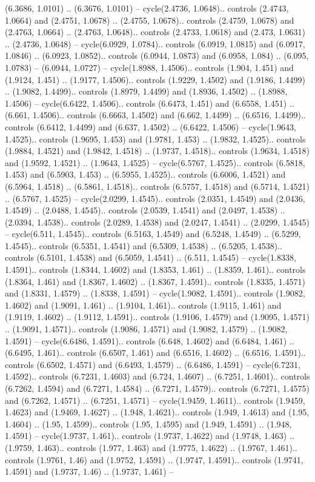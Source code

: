 (6.3686, 1.0101) .. (6.3676, 1.0101) -- cycle(2.4736, 1.0648).. controls (2.4743, 1.0664) and (2.4751, 1.0678) .. (2.4755, 1.0678).. controls (2.4759, 1.0678) and (2.4763, 1.0664) .. (2.4763, 1.0648).. controls (2.4733, 1.0618) and (2.473, 1.0631) .. (2.4736, 1.0648) -- cycle(6.0929, 1.0784).. controls (6.0919, 1.0815) and (6.0917, 1.0846) .. (6.0923, 1.0852).. controls (6.0944, 1.0873) and (6.0958, 1.084) .. (6.095, 1.0783) -- (6.0944, 1.0727) -- cycle(1.8988, 1.4506).. controls (1.904, 1.451) and (1.9124, 1.451) .. (1.9177, 1.4506).. controls (1.9229, 1.4502) and (1.9186, 1.4499) .. (1.9082, 1.4499).. controls (1.8979, 1.4499) and (1.8936, 1.4502) .. (1.8988, 1.4506) -- cycle(6.6422, 1.4506).. controls (6.6473, 1.451) and (6.6558, 1.451) .. (6.661, 1.4506).. controls (6.6663, 1.4502) and (6.662, 1.4499) .. (6.6516, 1.4499).. controls (6.6412, 1.4499) and (6.637, 1.4502) .. (6.6422, 1.4506) -- cycle(1.9643, 1.4525).. controls (1.9695, 1.453) and (1.9781, 1.453) .. (1.9832, 1.4525).. controls (1.9884, 1.4521) and (1.9842, 1.4518) .. (1.9737, 1.4518).. controls (1.9634, 1.4518) and (1.9592, 1.4521) .. (1.9643, 1.4525) -- cycle(6.5767, 1.4525).. controls (6.5818, 1.453) and (6.5903, 1.453) .. (6.5955, 1.4525).. controls (6.6006, 1.4521) and (6.5964, 1.4518) .. (6.5861, 1.4518).. controls (6.5757, 1.4518) and (6.5714, 1.4521) .. (6.5767, 1.4525) -- cycle(2.0299, 1.4545).. controls (2.0351, 1.4549) and (2.0436, 1.4549) .. (2.0488, 1.4545).. controls (2.0539, 1.4541) and (2.0497, 1.4538) .. (2.0394, 1.4538).. controls (2.0289, 1.4538) and (2.0247, 1.4541) .. (2.0299, 1.4545) -- cycle(6.511, 1.4545).. controls (6.5163, 1.4549) and (6.5248, 1.4549) .. (6.5299, 1.4545).. controls (6.5351, 1.4541) and (6.5309, 1.4538) .. (6.5205, 1.4538).. controls (6.5101, 1.4538) and (6.5059, 1.4541) .. (6.511, 1.4545) -- cycle(1.8338, 1.4591).. controls (1.8344, 1.4602) and (1.8353, 1.461) .. (1.8359, 1.461).. controls (1.8364, 1.461) and (1.8367, 1.4602) .. (1.8367, 1.4591).. controls (1.8335, 1.4571) and (1.8331, 1.4579) .. (1.8338, 1.4591) -- cycle(1.9082, 1.4591).. controls (1.9082, 1.4602) and (1.9091, 1.461) .. (1.9104, 1.461).. controls (1.9115, 1.461) and (1.9119, 1.4602) .. (1.9112, 1.4591).. controls (1.9106, 1.4579) and (1.9095, 1.4571) .. (1.9091, 1.4571).. controls (1.9086, 1.4571) and (1.9082, 1.4579) .. (1.9082, 1.4591) -- cycle(6.6486, 1.4591).. controls (6.648, 1.4602) and (6.6484, 1.461) .. (6.6495, 1.461).. controls (6.6507, 1.461) and (6.6516, 1.4602) .. (6.6516, 1.4591).. controls (6.6502, 1.4571) and (6.6493, 1.4579) .. (6.6486, 1.4591) -- cycle(6.7231, 1.4592).. controls (6.7231, 1.4603) and (6.724, 1.4607) .. (6.7251, 1.4601).. controls (6.7262, 1.4594) and (6.7271, 1.4584) .. (6.7271, 1.4579).. controls (6.7271, 1.4575) and (6.7262, 1.4571) .. (6.7251, 1.4571) -- cycle(1.9459, 1.4611).. controls (1.9459, 1.4623) and (1.9469, 1.4627) .. (1.948, 1.4621).. controls (1.949, 1.4613) and (1.95, 1.4604) .. (1.95, 1.4599).. controls (1.95, 1.4595) and (1.949, 1.4591) .. (1.948, 1.4591) -- cycle(1.9737, 1.461).. controls (1.9737, 1.4622) and (1.9748, 1.463) .. (1.9759, 1.463).. controls (1.977, 1.463) and (1.9775, 1.4622) .. (1.9767, 1.461).. controls (1.9761, 1.46) and (1.9752, 1.4591) .. (1.9747, 1.4591).. controls (1.9741, 1.4591) and (1.9737, 1.46) .. (1.9737, 1.461) -- 